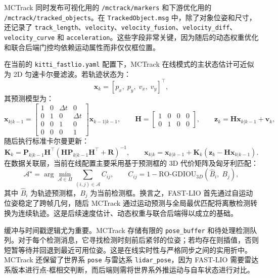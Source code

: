 \documentclass[utf8, a4paper, 12pt]{ctexart}
\begin{document}
MCTrack 同时发布可视化用的 \texttt{/mctrack/markers} 和下游优化用的 \texttt{/mctrack/tracked\_objects}。在 \texttt{TrackedObject.msg} 中，除了对象位姿和尺寸，还记录了 \texttt{track\_length}、\texttt{velocity}、\texttt{velocity\_fusion}、\texttt{velocity\_diff}、\texttt{velocity\_curve} 和 \texttt{acceleration}。这些字段非常关键，因为随后的动态权重优化和联合后端门控均依赖运动属性而非仅仅框位置。

在当前的 \texttt{kitti\_fastlio.yaml} 配置下，MCTrack 在线模式的主状态估计可近似为 2D 匀速卡尔曼滤波。若轨迹状态为：
\begin{equation}
\mathbf{x}_k=[p_x,\; p_y,\; v_x,\; v_y]^\top,
\end{equation}
其预测模型为：
\begin{equation}
\mathbf{x}_{k|k-1}=
\begin{bmatrix}
1 & 0 & \Delta t & 0\\
0 & 1 & 0 & \Delta t\\
0 & 0 & 1 & 0\\
0 & 0 & 0 & 1
\end{bmatrix}
\mathbf{x}_{k-1|k-1},
\qquad
\mathbf{H}=
\begin{bmatrix}
1 & 0 & 0 & 0\\
0 & 1 & 0 & 0
\end{bmatrix},
\qquad
\mathbf{z}_k=\mathbf{H}\mathbf{x}_{k|k-1}+\mathbf{v}_k,
\end{equation}
随后执行标准卡尔曼更新：
\begin{equation}
\mathbf{K}_k=\mathbf{P}_{k|k-1}\mathbf{H}^\top(\mathbf{H}\mathbf{P}_{k|k-1}\mathbf{H}^\top+\mathbf{R})^{-1},
\qquad
\mathbf{x}_{k|k}=\mathbf{x}_{k|k-1}+\mathbf{K}_k(\mathbf{z}_k-\mathbf{H}\mathbf{x}_{k|k-1}).
\end{equation}
在数据关联层，当前在线配置主要采用基于预测框的 3D 代价矩阵及匈牙利匹配：
\begin{equation}
\mathcal{A}^{\star}
=
\arg\min_{\mathcal{A}\in\Pi}
\sum_{(i,j)\in\mathcal{A}} C_{ij},
\qquad
C_{ij}=1-\mathrm{RO\mbox{-}GDIOU}_{3D}\!\left(\hat{B}_i,\; B_j\right),
\end{equation}
其中 \(\hat{B}_i\) 为轨迹预测框，\(B_j\) 为当前检测框。换言之，FAST-LIO 首先通过自运动位姿稳定了跨帧几何，随后 MCTrack 通过运动预测与全局最优匹配将离散检测转换为连续轨迹。这是后续速度估计、动态权重与联合后端得以成立的基础。

缓冲与时间戳逻辑尤为重要。MCTrack 存储有限的 \texttt{pose\_buffer} 和待处理检测队列。对于每个检测消息，它寻找检测时刻前后紧邻的位姿；若均存在则插值，否则短暂等待并回退到最近可用位姿。这是在线实时性与严格同步之间的实用折中。MCTrack 还保留了世界系 \texttt{pose} 与雷达系 \texttt{lidar\_pose}，因为 FAST-LIO 需要雷达系版本进行点-框相交判断，而后端则需将世界系外推运动与自车状态进行对比。
\end{document}
